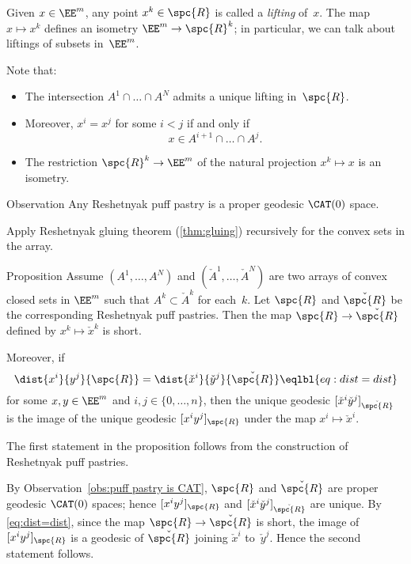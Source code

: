 Given $x\in \EE^m$, any point $x^k\in\spc{R}$ is called a {}\emph{lifting} of~$x$.
The map $x\mapsto x^k$ defines an isometry $\EE^m\to \spc{R}^k$;  
in particular, we can talk about liftings of subsets in~$\EE^m$.

Note that: 
\begin{itemize}
\item The intersection $A^1\cap\dots\cap A^N$ admits a unique lifting in~$\spc{R}$.
\item Moreover, $x^i=x^j$ for some $i<j$
if and only if 
\[x\in A^{i+1}\cap\dots\cap A^j.\]
\item The restriction $\spc{R}^k\to \EE^m$
of the natural projection $x^k\mapsto x$ is an isometry.
\end{itemize}




\begin{thm}{Observation}\label{obs:puff pastry is CAT}
Any Reshetnyak puff pastry is a proper geodesic $\CAT(0)$ space.
\end{thm}

 Apply Reshetnyak gluing theorem (\ref{thm:gluing}) recursively for the convex sets in the array.
\qeds

\begin{thm}{Proposition}\label{prop:A-check-A}
Assume $(A^1,\dots,A^N)$ and $(\check A^1,\dots,\check A^N)$ are two arrays of convex closed sets in $\EE^m$ 
such that $ A^k\subset \check A^k$ for each~$k$.
Let $\spc{R}$ and $\check{\spc{R}}$ be the corresponding Reshetnyak  puff pastries.
Then the map $\spc{R}\to\check{\spc{R}}$
defined by $x^k\mapsto\check x^k$ is short.

Moreover, if  
\[\dist{x^i}{y^j}{\spc{R}}=\dist{\check x^i}{\check y^j}{\check{\spc{R}}}\eqlbl{eq:dist=dist}\]
for some $x,y\in \EE^m$ and $i,j\in \{0,\dots,n\}$,
then the unique geodesic $[\check x^i \check y^j]_{\check{\spc{R}}}$ 
is the image of the unique geodesic $[x^i y^j]_{\spc{R}}$
under the map $x^i\mapsto \check x^i$.
\end{thm}

The first statement in the proposition 
follows from the construction of Reshetnyak  puff pastries.

By Observation~\ref{obs:puff pastry is CAT}, 
$\spc{R}$  and  $\check{\spc{R}}$ are proper geodesic $\CAT(0)$ spaces; 
hence $[x^i y^j]_{\spc{R}}$ 
and $[\check x^i \check y^j]_{\check{\spc{R}}}$ are unique.  
By \ref{eq:dist=dist}, since the map $\spc{R}\to\check{\spc{R}}$ is short, 
the image of $[x^i y^j]_{\spc{R}}$
is a geodesic of $\check{\spc{R}}$ joining $\check x^i$ to~$\check y^j$.
Hence the second statement follows.
\qeds

